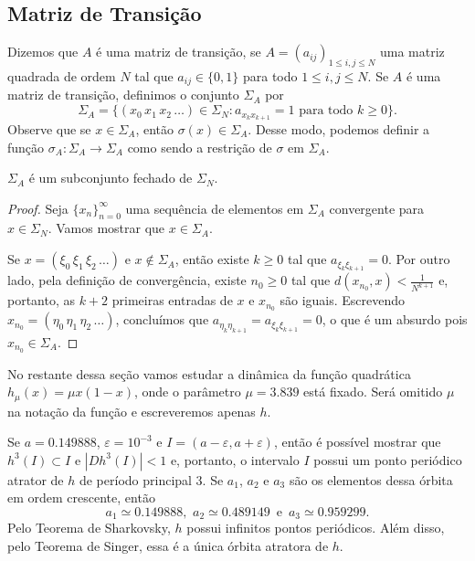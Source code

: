 \subsection{Matriz de Transição}

Dizemos que $A$ é uma matriz de transição, se $A = (a_{ij})_{1 \leq i,j \leq N}$ uma matriz quadrada de ordem $N$ tal que $a_{ij} \in \lbrace 0, 1 \rbrace$ para todo $1 \leq i,j \leq N$.
Se $A$ é uma matriz de transição, definimos o conjunto $\Sigma_A$ por
$$\Sigma_A = \lbrace (x_0 \, x_1 \, x_2 \, \dots) \in \Sigma_N : a_{x_k x_{k+1}} = 1 \text{ para todo } k \geq 0 \rbrace.$$
Observe que se $x \in \Sigma_A$, então $\sigma(x) \in \Sigma_A$.
Desse modo, podemos definir a função $\sigma_A: \Sigma_A \to \Sigma_A$ como sendo a restrição de $\sigma$ em $\Sigma_A$.

\begin{proposition}
$\Sigma_A$ é um subconjunto fechado de $\Sigma_N$.
\end{proposition}

\begin{proof}
Seja $\lbrace x_n \rbrace_{n=0}^{\infty}$ uma sequência de elementos em $\Sigma_A$ convergente para $x \in \Sigma_N$.
Vamos mostrar que $x \in \Sigma_A$.

Se $x = (\xi_0 \, \xi_1 \, \xi_2 \, \dots)$ e $x \notin \Sigma_A$, então existe $k \geq 0$ tal que $a_{\xi_k \xi_{k+1}} = 0$. Por outro lado, pela definição de convergência, existe $n_0 \geq 0$ tal que $d(x_{n_0}, x) < \frac{1}{N^{k+1}}$ e, portanto, as $k+2$ primeiras entradas de $x$ e $x_{n_0}$ são iguais. Escrevendo $x_{n_0} = (\eta_0 \, \eta_1 \, \eta_2 \, \dots)$, concluímos que $a_{\eta_k \eta_{k+1}} = a_{\xi_k \xi_{k+1}} = 0$, o que é um absurdo pois $x_{n_0} \in \Sigma_A$.
\end{proof}

No restante dessa seção vamos estudar a dinâmica da função quadrática $h_\mu(x) = \mu x(1-x)$, onde o parâmetro $\mu = 3.839$ está fixado. Será omitido $\mu$ na notação da função e escreveremos apenas $h$.

Se $a = 0.149888$, $\varepsilon = 10^{-3}$ e $I = (a - \varepsilon, a + \varepsilon)$, então é possível mostrar que $h^3(I) \subset I$ e $|D h^3(I)| < 1$ e, portanto, o intervalo $I$ possui um ponto periódico atrator de $h$ de período principal $3$. Se $a_1$, $a_2$ e $a_3$ são os elementos dessa órbita em ordem crescente, então
$$a_1 \simeq 0.149888 \text{, } \, a_2 \simeq 0.489149 \, \text{ e } \, a_3 \simeq 0.959299.$$
Pelo Teorema de Sharkovsky, $h$ possui infinitos pontos periódicos. Além disso, pelo Teorema de Singer, essa é a única órbita atratora de $h$.

